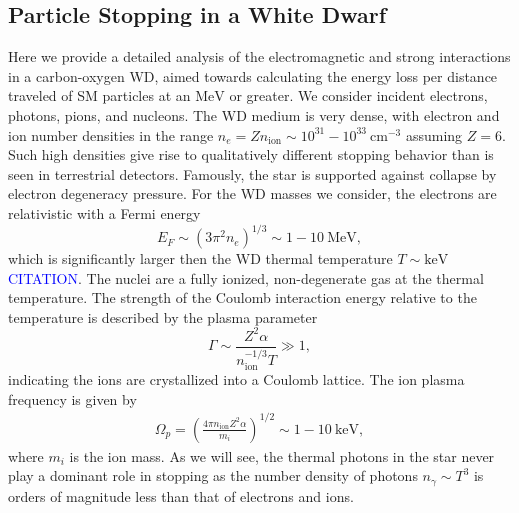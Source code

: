 \documentclass[twocolumn,preprintnumbers,amsmath,amssymb,prl, superscriptaddress]{revtex4}
\newcommand{\MeV}{\text{MeV}}
\newcommand{\keV}{\text{keV}}
\newcommand{\cm}{\text{cm}}
\def\r{\right)}
\def\l{\left(}
\begin{document}
\begin{appendices}

\section{Particle Stopping in a White Dwarf}
\label{sec:Appendix}
Here we provide a detailed analysis of the electromagnetic and strong interactions in a carbon-oxygen WD, aimed towards calculating the energy loss per distance traveled of SM particles at an $\text{MeV}$ or greater.
We consider incident electrons, photons, pions, and nucleons.
The WD medium is very dense, with electron and ion number densities in the range $n_e = Z n_\text{ion} \sim 10^{31} - 10^{33} ~\cm^{-3}$ assuming $Z=6$.
Such high densities give rise to qualitatively different stopping behavior than is seen in terrestrial detectors.
Famously, the star is supported against collapse by electron degeneracy pressure.
For the WD masses we consider, the electrons are relativistic with a Fermi energy
\begin{equation}
  E_F \sim (3 \pi^2 n_e)^{1/3} \sim 1 -10 ~\MeV,
\end{equation}
which is significantly larger then the WD thermal temperature $T \sim \keV$ \textcolor{blue}{CITATION}.
The nuclei are a fully ionized, non-degenerate gas at the thermal temperature.
The strength of the Coulomb interaction energy relative to the temperature is described by the plasma parameter
\begin{equation}
\label{eq:lattice}
 \Gamma \sim \frac{Z^2 \alpha}{n_\text{ion}^{-1/3}T} \gg 1,
\end{equation}
indicating the ions are crystallized into a Coulomb lattice.
The ion plasma frequency is given by
\begin{align}
\Omega_p = \l \frac{4 \pi n_\text{ion} Z^2 \alpha}{m_i}\r^{1/2} \sim 1 - 10~\text{keV},
\end{align}
where $m_i$ is the ion mass.
As we will see, the thermal photons in the star never play a dominant role in stopping as the number density of photons $n_\gamma \sim T^3$ is orders of magnitude less than that of electrons and ions.




\end{appendices}
\end{document}
